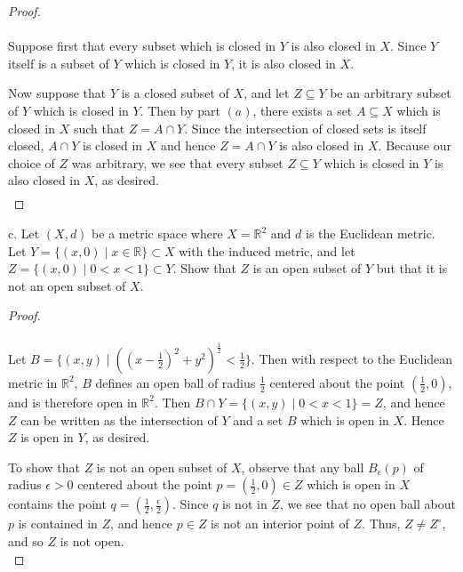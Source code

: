 \begin{proof}\renewcommand{\qedsymbol}{}\ \\\\
    Suppose first that every subset which is closed in $Y$ is also closed in $X$. Since $Y$ itself is a subset of $Y$ 
    which is closed in $Y$, it is also closed in $X$.

    Now suppose that $Y$ is a closed subset of $X$, and let $Z \subseteq Y$ be an arbitrary subset of $Y$ which is 
    closed in $Y$. Then by part $(a)$, there exists a set $A \subseteq X$ which is closed in $X$ such that 
    $Z = A \cap Y$. Since the intersection of closed sets is itself closed, $A \cap Y$ is closed in $X$
    and hence $Z = A \cap Y$ is also closed in $X$. Because our choice of $Z$ was arbitrary, we see that every
    subset $Z \subseteq Y$ which is closed in $Y$ is also closed in $X$, as desired.
    \begin{align*}
    \end{align*}
\end{proof}

\pagebreak
c.  Let $(X, d)$ be a metric space where $X = \mathbb{R}^2$ and $d$ is the Euclidean metric. Let 
    $Y = \{(x, 0) \mid x \in \mathbb{R} \} \subset X$ with the induced metric, and let 
    $Z = \{(x, 0) \mid 0 < x < 1 \} \subset Y$. Show that $Z$ is an open subset of $Y$ but that it is not an open subset
    of $X$.

\begin{proof}\ \\\\
    Let $B = \{(x, y) \mid \left((x - \frac{1}{2})^2 + y^2 \right)^{\frac{1}{2}} < \frac{1}{2} \}$. Then with respect to
    the Euclidean metric in $\mathbb{R}^2$, $B$ defines an open ball of radius $\frac{1}{2}$ centered about the point 
    $(\frac{1}{2}, 0)$, and is therefore open in $\mathbb{R}^2$. Then $B \cap Y = \{ (x, y) \mid 0 < x < 1 \} = Z$, and 
    hence $Z$ can be written as the intersection of $Y$ and a set $B$ which is open in $X$. Hence $Z$ is open in $Y$,
    as desired.

    To show that $Z$ is not an open subset of $X$, observe that any ball $B_\epsilon(p)$ of radius
    $\epsilon > 0$ centered about the point $p = (\frac{1}{2}, 0) \in Z$ which is open in $X$ contains the point
    $q = (\frac{1}{2}, \frac{\epsilon}{2})$. Since $q$ is not in $Z$, we see that no open ball about $p$ is contained
    in $Z$, and hence $p \in Z$ is not an interior point of $Z$. Thus, $Z \neq Z^\circ$, and so $Z$ is not open.
    \ \\
\end{proof}

\pagebreak